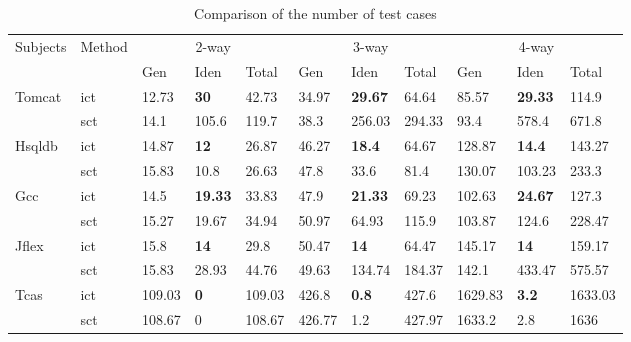 \documentclass{sig-alternate}
\begin{document}
\begin{table}[htbp]
\center
\caption{Comparison of the number of test cases}
\label{cm_elda_fglt_test}
\begin{tabular}{|ll|lll|lll|lll|}
\hline
\multirow{2}{*}{Subjects} & \multirow{2}{*}{Method} & \multicolumn{3}{c|}{2-way} & \multicolumn{3}{c|}{3-way} & \multicolumn{3}{c|}{4-way} \\ \cline{3-11}
                          &                         &Gen  & Iden & Total  &  Gen  & Iden & Total  & Gen  & Iden & Total   \\ \hline
Tomcat                    & ict                     & 12.73    & \textbf{30}     & 42.73  & 34.97    & \textbf{29.67}  & 64.64  & 85.57   & \textbf{29.33}  & 114.9   \\
                          & sct                     & 14.1     & 105.6  & 119.7  & 38.3     & 256.03 & 294.33 & 93.4    & 578.4  & 671.8   \\ \hline
Hsqldb                    & ict                     & 14.87    & \textbf{12}     & 26.87  & 46.27    & \textbf{18.4}   & 64.67  & 128.87  & \textbf{14.4}   & 143.27  \\
                          & sct                     & 15.83    & 10.8   & 26.63  & 47.8     & 33.6   & 81.4   & 130.07  & 103.23 & 233.3   \\ \hline
Gcc                       & ict                     & 14.5     & \textbf{19.33}  & 33.83  & 47.9     & \textbf{21.33}  & 69.23  & 102.63  & \textbf{24.67}  & 127.3   \\
                          & sct                     & 15.27    & 19.67  & 34.94  & 50.97    & 64.93  & 115.9  & 103.87  & 124.6  & 228.47  \\ \hline
Jflex                     & ict                     & 15.8     & \textbf{14}     & 29.8   & 50.47    & \textbf{14}     & 64.47  & 145.17  & \textbf{14}     & 159.17  \\
                          & sct                     & 15.83    & 28.93  & 44.76  & 49.63    & 134.74 & 184.37 & 142.1   & 433.47 & 575.57  \\ \hline
Tcas                      & ict                     & 109.03   & \textbf{0}      & 109.03 & 426.8    & \textbf{0.8}    & 427.6  & 1629.83 & \textbf{3.2}    & 1633.03 \\
                          & sct                     & 108.67   & 0      & 108.67 & 426.77   & 1.2    & 427.97 & 1633.2  & 2.8    & 1636    \\ \hline
\end{tabular}
\end{table}
\end{document}
